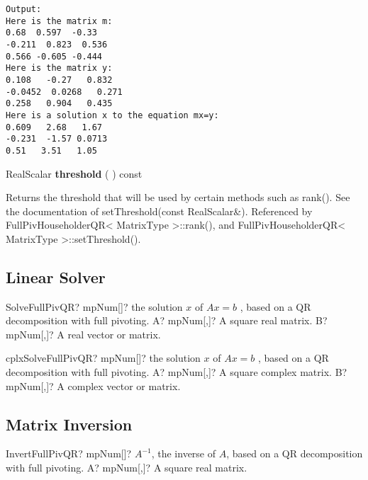 \begin{verbatim}
Output:
Here is the matrix m:
0.68  0.597  -0.33
-0.211  0.823  0.536
0.566 -0.605 -0.444
Here is the matrix y:
0.108   -0.27   0.832
-0.0452  0.0268   0.271
0.258   0.904   0.435
Here is a solution x to the equation mx=y:
0.609   2.68   1.67
-0.231  -1.57 0.0713
0.51   3.51   1.05
\end{verbatim}


\vspace{0.3cm}
RealScalar \textbf{threshold}  ( )  const 

Returns the threshold that will be used by certain methods such as rank().
See the documentation of setThreshold(const RealScalar\&). 
Referenced by FullPivHouseholderQR< MatrixType >::rank(), and FullPivHouseholderQR< MatrixType >::setThreshold().



\subsection{Linear Solver}

\begin{mpFunctionsExtract}
	\mpFunctionTwo
	{SolveFullPivQR? mpNum[]? the solution $x$ of $A x = b$ , based on a QR decomposition with full pivoting.}
	{A? mpNum[,]? A square real matrix.}
	{B? mpNum[,]? A real vector or matrix.}
\end{mpFunctionsExtract}


\vspace{0.6cm}
\begin{mpFunctionsExtract}
	\mpFunctionTwo
	{cplxSolveFullPivQR? mpNum[]? the solution $x$ of $A x = b$ , based on a QR decomposition with full pivoting.}
	{A? mpNum[,]? A square complex matrix.}
	{B? mpNum[,]? A complex vector or matrix.}
\end{mpFunctionsExtract}





\subsection{Matrix Inversion}

\begin{mpFunctionsExtract}
	\mpFunctionOne
	{InvertFullPivQR? mpNum[]? $A^{-1}$, the inverse of $A$, based on a QR decomposition with full pivoting.}
	{A? mpNum[,]? A square real matrix.}
\end{mpFunctionsExtract}

